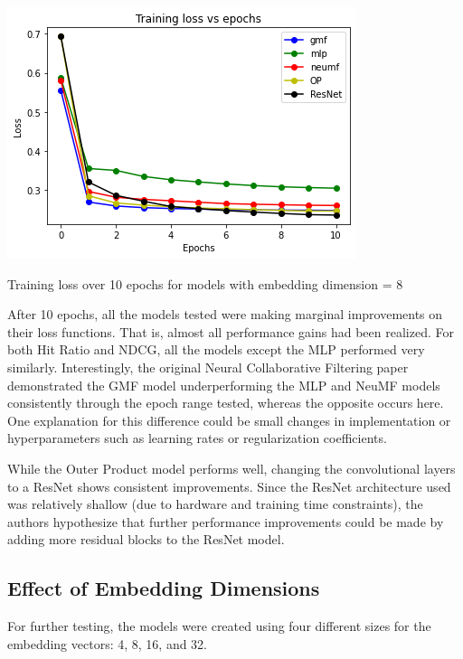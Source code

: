 \documentclass{article}
\begin{document}
\begin{center}
\includegraphics[scale=0.5]{loss}

Training loss over 10 epochs for models with embedding dimension = 8
\end{center}

After 10 epochs, all the models tested were making marginal improvements on their loss functions. That is, almost all performance gains had been realized. For both Hit Ratio and NDCG, all the models except the MLP performed very similarly. Interestingly, the original Neural Collaborative Filtering paper demonstrated the GMF model underperforming the MLP and NeuMF models consistently through the epoch range tested, whereas the opposite occurs here. One explanation for this difference could be small changes in implementation or hyperparameters such as learning rates or regularization coefficients.

While the Outer Product model performs well, changing the convolutional layers to a ResNet shows consistent improvements. Since the ResNet architecture used was relatively shallow (due to hardware and training time constraints), the authors hypothesize that further performance improvements could be made by adding more residual blocks to the ResNet model.

\subsection{Effect of Embedding Dimensions}
For further testing, the models were created using four different sizes for the embedding vectors: 4, 8, 16, and 32. 
\end{document}
